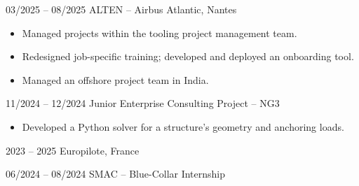 

        {03/2025 -- 08/2025}
        {ALTEN -- Airbus Atlantic, Nantes}
        {%
          \begin{itemize}
            \item Managed projects within the tooling project management team.
            \item Redesigned job-specific training; developed and deployed an onboarding tool.
            \item Managed an offshore project team in India.
          \end{itemize}
        }

        {11/2024 -- 12/2024}
        {Junior Enterprise Consulting Project -- NG3}
        {%
          \begin{itemize}
            \item Developed a Python solver for a structure's geometry and anchoring loads.
          \end{itemize}
        }

        {2023 -- 2025}
        {Europilote, France}
        {
        }

        {06/2024 -- 08/2024}
        {SMAC -- Blue-Collar Internship}
        {}


